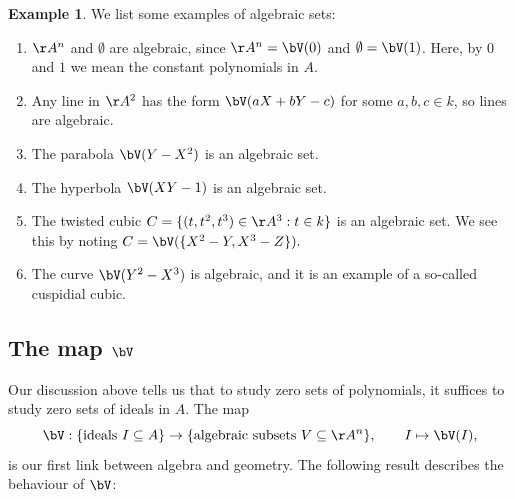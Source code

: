 \documentclass[12pt]{amsart}
\theoremstyle{plain}
\theoremstyle{definition}
\newtheorem{example}[theorem]{Example}
\begin{document}
\begin{example}\label{algsetex}
We list some examples of algebraic sets:
\begin{enumerate}
\item
$\AA^n$ and $\emptyset$ are algebraic, since $\AA^n = \bV(0)$ and $\emptyset = \bV(1)$.
Here, by $0$ and $1$ we mean the constant polynomials in $A$.

\item
Any line in $\AA^2$ has the form $\bV(aX+bY-c)$ for some $a, b, c \in k$, so lines are algebraic.

\item
The parabola $\bV(Y-X^2)$ is an algebraic set.

\item
The hyperbola $\bV(XY - 1)$ is an algebraic set.

\item
The twisted cubic $C = \{(t, t^2, t^3) \in \AA^3 : t \in k\}$ is an algebraic set.
We see this by noting $C = \bV(\{X^2 - Y, X^3 - Z\}).$

\item 
The curve $\bV(Y^2 - X^3)$ is algebraic, and it is an example of a so-called cuspidial cubic.
\end{enumerate}
\end{example}





\subsection{The map $\bV$}
Our discussion above tells us that to study zero sets of polynomials, it suffices to study zero sets of ideals in $A$.
The map
$$\bV : \{\text{ideals } I \subseteq A\} \to \{\text{algebraic subsets } V \subseteq \AA^n\}, \qquad I \mapsto \bV(I),$$
is our first link between algebra and geometry.
The following result describes the behaviour of $\bV$:
\end{document}
